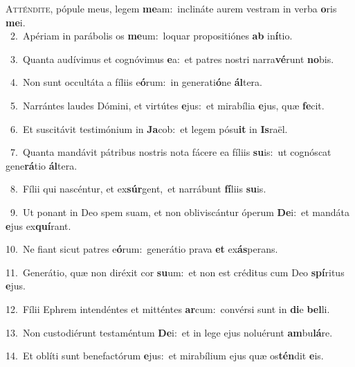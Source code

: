 \lettrine{\initial\textcolor{\initialcolor}{A}}{tténdite,} pópule meus, legem \textbf{me}\-am:~\star inclináte aurem vestram in verba \textbf{o}\-ris \textbf{me}\-i.\\
{\numbfont\textcolor{\numbcolor}{~2.}}~Apériam in parábolis os \textbf{me}\-um:~\star loquar propositiónes \textbf{ab} in\-\textbf{í}\-tio.\par
{\numbfont\textcolor{\numbcolor}{~3.}}~Quanta audívimus et cognóvimus \textbf{e}\-a:~\star et patres nostri narra\-\textbf{vé}\-runt \textbf{no}\-bis.\par
{\numbfont\textcolor{\numbcolor}{~4.}}~Non sunt occultáta a fíliis e\-\textbf{ó}\-rum:~\star in generati\-\textbf{ó}\-ne \textbf{ál}\-tera.\par
{\numbfont\textcolor{\numbcolor}{~5.}}~Narrántes laudes Dómini, et virtútes \textbf{e}\-jus:~\star et mirabília \textbf{e}\-jus, quæ \textbf{fe}\-cit.\par
{\numbfont\textcolor{\numbcolor}{~6.}}~Et suscitávit testimónium in \textbf{Ja}\-cob:~\star et legem pósu\textbf{it} in \textbf{Is}\-raël.\par
{\numbfont\textcolor{\numbcolor}{~7.}}~Quanta mandávit pátribus nostris nota fácere ea fíliis \textbf{su}\-is:~\star ut cognóscat gene\-\textbf{rá}\-tio \textbf{ál}\-tera.\par
{\numbfont\textcolor{\numbcolor}{~8.}}~Fílii qui nascéntur, et ex\-\textbf{súr}\-gent,~\star et narrábunt \textbf{fí}\-liis \textbf{su}\-is.\par
{\numbfont\textcolor{\numbcolor}{~9.}}~Ut ponant in Deo spem suam, et non obliviscántur óperum \textbf{De}\-i:~\star et mandáta \textbf{e}\-jus ex\-\textbf{quí}\-rant.\par
{\numbfont\textcolor{\numbcolor}{10.}}~Ne fiant sicut patres e\-\textbf{ó}\-rum:~\star generátio prava \textbf{et} ex\-\textbf{ás}\-perans.\par
{\numbfont\textcolor{\numbcolor}{11.}}~Generátio, quæ non diréxit cor \textbf{su}\-um:~\star et non est créditus cum Deo \textbf{spí}\-ritus \textbf{e}\-jus.\par
{\numbfont\textcolor{\numbcolor}{12.}}~Fílii Ephrem intendéntes et mitténtes \textbf{ar}\-cum:~\star convérsi sunt in \textbf{di}\-e \textbf{bel}\-li.\par
{\numbfont\textcolor{\numbcolor}{13.}}~Non custodiérunt testaméntum \textbf{De}\-i:~\star et in lege ejus noluérunt \textbf{am}\-bu\-\textbf{lá}\-re.\par
{\numbfont\textcolor{\numbcolor}{14.}}~Et oblíti sunt benefactórum \textbf{e}\-jus:~\star et mirabílium ejus quæ os\-\textbf{tén}\-dit \textbf{e}\-is.\par
